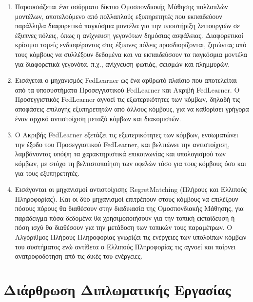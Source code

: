\begin{enumerate}
    \item Παρουσιάζεται ένα ασύρματο δίκτυο Ομοσπονδιακής Μάθησης
     πολλαπλών μοντέλων, αποτελούμενο από πολλαπλούς εξυπηρετητές που εκπαιδεύουν παράλληλα διαφορετικά παγκόσμια μοντέλα για την υποστήριξη λειτουργιών σε έξυπνες πόλεις, όπως η ανίχνευση γεγονότων δημόσιας ασφάλειας. Διαφορετικοί κρίσιμοι τομείς ενδιαφέροντος στις έξυπνες πόλεις προσδιορίζονται, ζητώντας από τους κόμβους να συλλέξουν δεδομένα και να εκπαιδεύσουν τα παγκόσμια μοντέλα για διαφορετικά γεγονότα, π.χ., ανίχνευση φωτιάς, σεισμών και πλημμυρών.
    \item Εισάγεται ο μηχανισμός FedLearner ως ένα αρθρωτό πλαίσιο που αποτελείται από τα υποσυστήματα Προσεγγιστικού FedLearner και Ακριβή FedLearner. Ο Προσεγγιστικός FedLearner αγνοεί τις εξωτερικότητες των κόμβων, δηλαδή τις αποφάσεις επιλογής εξυπηρετητών από άλλους κόμβους, για να καθορίσει γρήγορα έναν αρχικό αντιστοίχιση μεταξύ κόμβων και διακομιστών.
    \item Ο Ακριβής FedLearner εξετάζει τις εξωτερικότητες των κόμβων, ενσωματώνει την έξοδο του Προσεγγιστικού FedLearner, και βελτιώνει την αντιστοίχιση, λαμβάνοντας υπόψη τα χαρακτηριστικά επικοινωνίας και υπολογισμού των κόμβων, με στόχο τη βελτιστοποίηση των οφελών τόσο για τους κόμβους όσο και για τους εξυπηρετητές.
    \item Εισάγονται οι μηχανισμοί αντιστοίχισης RegretMatching (Πλήρους και Ελλιπούς Πληροφορίας). Και οι δύο μηχανισμοί επιτρέπουν στους κόμβους να επιλέξουν πόσους πόρους θα διαθέσουν στην διαδικασία της Ομοσπονδιακής Μάθησης, για παράδειγμα πόσα δεδομένα θα χρησιμοποιήσουν για την τοπική εκπαίδευση ή πόση ισχύ θα διαθέσουν για την μετάδοση των τοπικών τους παραμέτρων. Ο Αλγόριθμος Πλήρους Πληροφορίας γνωρίζει τις ενέργειες των υπολοίπων κόμβων του συστήματος ενώ αντίθετα ο Ελλιπούς Πληροφορίας τις αγνοεί και παίρνει ανατροφοδότηση από τις δικές του ενέργειες.
\end{enumerate}


\section{Διάρθρωση Διπλωματικής Εργασίας}

